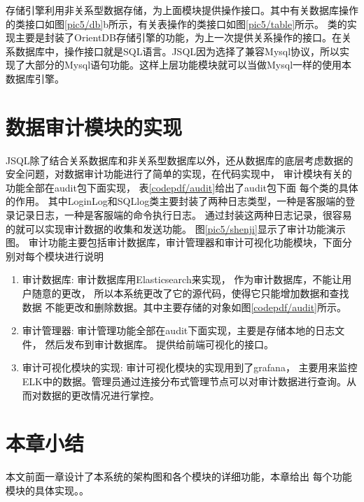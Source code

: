 存储引擎利用非关系型数据存储，为上面模块提供操作接口。其中有关数据库操作的类接口如图\ref{pic5/db}b所示，有关表操作的类接口如图\ref{pic5/table}所示。
类的实现主要是封装了OrientDB存储引擎的功能，为上一次提供关系操作的接口。在关系数据库中，操作接口就是SQL语言。JSQL因为选择了兼容Mysql协议，所以实现了大部分的Mysql语句功能。这样上层功能模块就可以当做Mysql一样的使用本数据库引擎。
\section{数据审计模块的实现}
JSQL除了结合关系数据库和非关系型数据库以外，还从数据库的底层考虑数据的安全问题，对数据审计功能进行了简单的实现，在代码实现中，
审计模块有关的功能全部在audit包下面实现，
表\ref{codepdf/audit}给出了audit包下面
每个类的具体的作用。
其中LoginLog和SQLlog类主要封装了两种日志类型，一种是客服端的登录记录日志，一种是客服端的命令执行日志。
通过封装这两种日志记录，很容易的就可以实现审计数据的收集和发送功能。
图\ref{pic5/shenji}显示了审计功能演示图。
审计功能主要包括审计数据库，审计管理器和审计可视化功能模块，下面分别对每个模块进行说明
\begin{enumerate}[fullwidth,itemindent=2em,listparindent=2em]
	\item 审计数据库:
	审计数据库用Elasticsearch来实现，
	作为审计数据库，不能让用户随意的更改，
	所以本系统更改了它的源代码，使得它只能增加数据和查找数据
	不能更改和删除数据。其中主要存储的对象如图\ref{codepdf/audit}所示。
	\item 审计管理器:
	审计管理功能全部在audit下面实现，主要是存储本地的日志文件，
	然后发布到审计数据库。
	提供给前端可视化的接口。
	\item 审计可视化模块的实现:
	审计可视化模块的实现用到了grafana，
	主要用来监控ELK中的数据。管理员通过连接分布式管理节点可以对审计数据进行查询。从而对数据的更改情况进行掌控。
\end{enumerate}
\section{本章小结}
本文前面一章设计了本系统的架构图和各个模块的详细功能，本章给出
每个功能模块的具体实现。。
